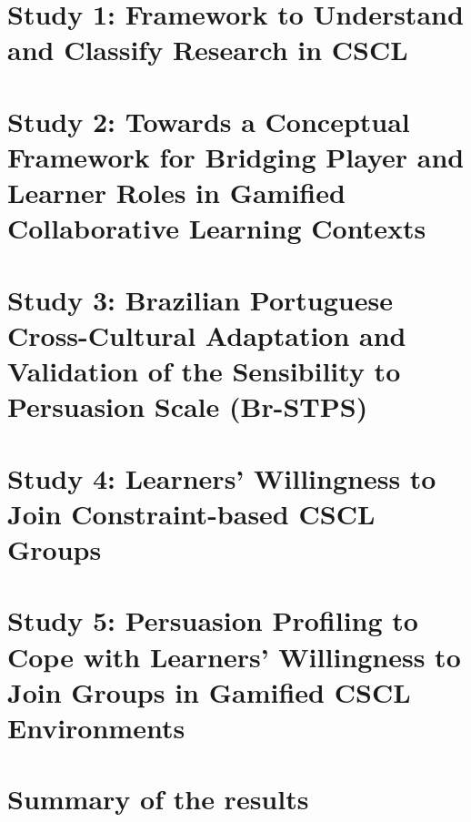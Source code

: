 \section[Study 1]{Study 1: Framework to Understand and Classify Research in CSCL}

\section[Study 2]{Study 2: Towards a Conceptual Framework for Bridging Player and Learner Roles in Gamified Collaborative Learning Contexts}

\section[Study 3]{Study 3: Brazilian Portuguese Cross-Cultural Adaptation and Validation of the Sensibility to Persuasion Scale (Br-STPS)}

\section[Study 4]{Study 4: Learners' Willingness to Join Constraint-based CSCL Groups}

\section[Study 5]{Study 5: Persuasion Profiling to Cope with Learners' Willingness to Join Groups in Gamified CSCL Environments}


\section{Summary of the results}